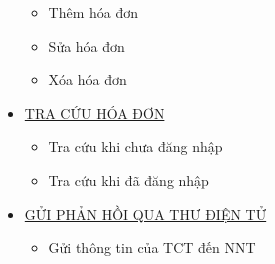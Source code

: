 \begin{itemize}
\begin{itemize}
          \item            Thêm hóa đơn  
          \item            Sửa hóa đơn 
          \item             Xóa     hóa đơn
                \end{itemize}
                \item                        \underline{\textsc{TRA CỨU HÓA ĐƠN}}
                   \begin{itemize}
        \item            Tra cứu     khi   chưa đăng nhập
        \item         Tra cứu     khi   đã đăng nhập
    \end{itemize}
    \item                      \underline{\textsc{GỬI PHẢN HỒI QUA THƯ ĐIỆN TỬ}}
          \begin{itemize}
              \item                        Gửi thông tin của TCT đến NNT
          \end{itemize}
\end{itemize}












